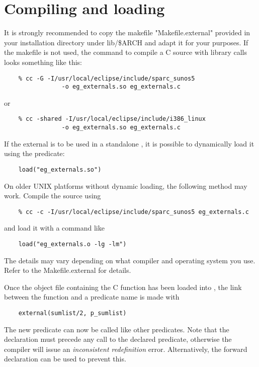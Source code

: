 \section{Compiling and loading}
It is strongly recommended to copy the makefile "Makefile.external"
provided in your  installation directory under lib/\$ARCH and adapt it
for your purposes.
If the makefile is not used, the command to compile a C source
with {\eclipse} library calls looks something like this:
\begin{verbatim}
    % cc -G -I/usr/local/eclipse/include/sparc_sunos5
                -o eg_externals.so eg_externals.c
\end{verbatim}
or
\begin{verbatim}
    % cc -shared -I/usr/local/eclipse/include/i386_linux
                -o eg_externals.so eg_externals.c
\end{verbatim}
If the external is to be used in a standalone {\eclipse},
it is possible to dynamically load it
using the 
predicate:
\begin{verbatim}
    load("eg_externals.so")
\end{verbatim}
On older UNIX platforms without dynamic loading, the following method
may work. Compile the source using
\begin{verbatim}
    % cc -c -I/usr/local/eclipse/include/sparc_sunos5 eg_externals.c
\end{verbatim}
and load it with a command like
\begin{verbatim}
    load("eg_externals.o -lg -lm")
\end{verbatim}
The details may vary depending on what compiler and operating system
you use.  Refer to the Makefile.external for details.

Once the object file containing the C function has been loaded into
{\eclipse}, the link between the function and a predicate name
is made with
\begin{verbatim}
    external(sumlist/2, p_sumlist)
\end{verbatim}
The new predicate can now be called like other predicates.
Note that the 
declaration must precede any call to the declared predicate,
otherwise the {\eclipse} compiler will issue an {\em inconsistent
redefinition} error. Alternatively, the
forward declaration can be used to prevent this.

